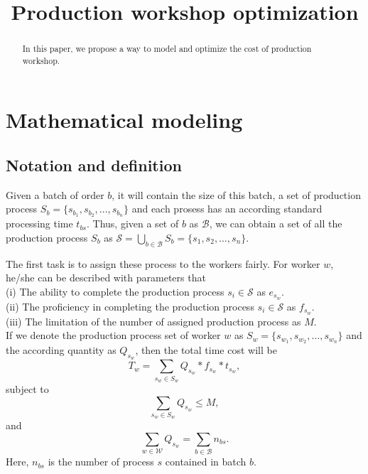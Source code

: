 \documentclass[10pt,reqno]{amsart}
\numberwithin{equation}{section}
\begin{document}
\title{Production workshop optimization}%


\begin{abstract}
In this paper, we propose a way to model and optimize the cost of production workshop.
\end{abstract}
 \maketitle
 
\section{Mathematical modeling}\label{sec: model}
\subsection{Notation and definition}
Given a batch of order $b$, it will contain the size of this batch, a set of production process $S_b = \{s_{b_1}, s_{b_2}, \ldots, s_{b_n}\}$ and each prosess has an according standard processing time $t_{bs}$. Thus, given a set of $b$ as $\mathcal{B}$, we can obtain a set of all the production process $S_b$ as $\mathcal{S}=\bigcup\limits_{b\in\mathcal{B}} S_b = \{s_{1}, s_{2}, \ldots, s_{n}\}$.

The first task is to assign these process to the workers fairly. For worker $w$, he/she can be described with parameters that\\
(i)   The ability to complete the production process $s_i \in \mathcal{S}$ as $e_{s_w}$.\\
(ii)  The proficiency in completing the production process $s_i \in \mathcal{S}$ as $f_{s_w}$.\\
(iii) The limitation of the number of assigned production process as $M$.\\

If we denote the production process set of worker $w$ as $S_w = \{s_{w_1}, s_{w_2}, \ldots, s_{w_n}\}$ and the according quantity as $Q_{s_w}$, then the total time cost will be
\begin{equation}\label{cost_w}
    T_w = \sum_{s_w\in S_w} Q_{s_w}*f_{s_w}*t_{s_w},
\end{equation}
subject to 
\begin{equation}\label{subject_w}
    \sum_{s_w\in S_w} Q_{s_w} \leq M,
\end{equation}
and
\begin{equation}\label{subjct_b}
    \sum_{w\in\mathcal{W}}Q_{s_w} = \sum_{b\in\mathcal{B}}n_{bs}.
\end{equation}
Here, $n_{bs}$ is the number of process $s$ contained in batch $b$.
\end{document}
